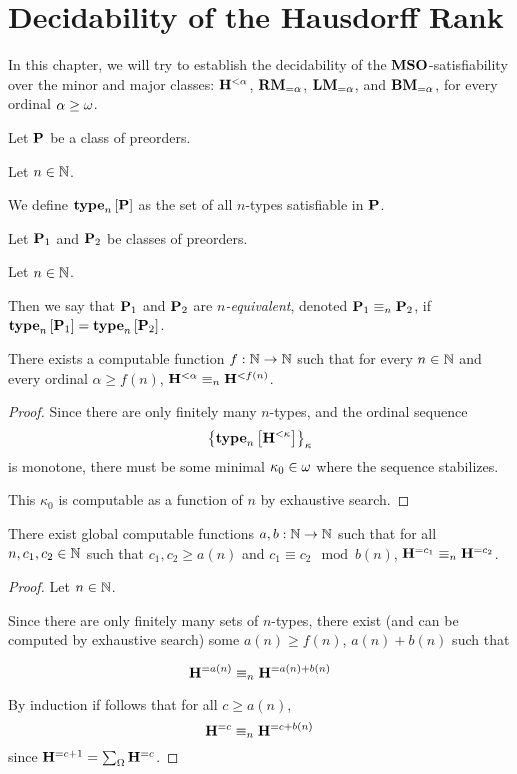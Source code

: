 \section{Decidability of the Hausdorff Rank}

In this chapter, we will try to establish the decidability of the $\mathbf{MSO}$-satisfiability
over the minor and major classes: $\mathbf{H}^{< \alpha}$, $\mathbf{RM}_{= \alpha}$, $\mathbf{LM}_{= \alpha}$, and $\mathbf{BM}_{= \alpha}$,
for every ordinal $\alpha \ge \omega$.

\begin{definition}
    Let $\mathbf{P}$ be a class of preorders.

    Let $n \in \mathbb{N}$.

    We define $\mathbf{type}_{n} \left[ {\mathbf{P}} \right]$ as the set of all
    $n$-types satisfiable in $\mathbf{P}$.
\end{definition}

\begin{definition}
    Let $\mathbf{P}_1$ and $\mathbf{P}_2$ be classes of preorders.

    Let $n \in \mathbb{N}$.

    Then we say that $\mathbf{P}_1$ and $\mathbf{P}_2$ are \emph{$n$-equivalent},
    denoted $\mathbf{P}_1 \equiv_n \mathbf{P}_2$,
    if $\mathbf{type}_{n} \left[ {\mathbf{P}_1} \right] = \mathbf{type}_{n} \left[ {\mathbf{P}_2} \right]$.
\end{definition}

\begin{lemma}\label{minor-computable}
    There exists a computable function $f: \mathbb{N} \to \mathbb{N}$ such that
    for every $n \in \mathbb{N}$ and every ordinal $\alpha \ge f(n)$,
    $\mathbf{H}^{< \alpha} \equiv_n \mathbf{H}^{< f(n)}$.
\end{lemma}

\begin{proof}
    Since there are only finitely many $n$-types,
    and the ordinal sequence \[\left\{ {\mathbf{type}_{n} \left[ {\mathbf{H}^{< \kappa}} \right]} \right\}_{\kappa}\]
    is monotone,
    there must be some minimal $\kappa_0 \in \omega$ where the sequence stabilizes.

    This $\kappa_0$ is computable as a function of $n$ by
    exhaustive search.
\end{proof}

\begin{lemma}\label{ab-lemma}
    There exist global computable functions $a, b : \mathbb{N} \to \mathbb{N}$ such that
    for all $n, c_1, c_2 \in \mathbb{N}$ such that $c_1, c_2 \ge a(n)$ and $c_1 \equiv c_2 \mod b(n)$,
    $\mathbf{H}^{= c_1} \equiv_n \mathbf{H}^{= c_2}$.
\end{lemma}

\begin{proof}
    Let $n \in \mathbb{N}$.

    Since there are only finitely many sets of $n$-types,
    there exist (and can be computed by exhaustive search)
    some $a(n) \ge f(n)$, $a(n) + b(n)$ such that

    \[
        \mathbf{H}^{= a(n)} \equiv_n \mathbf{H}^{= a(n) + b(n)}
    \]

    By induction if follows that for all $c \ge a(n)$,
    \[
        \mathbf{H}^{= c} \equiv_n \mathbf{H}^{= c + b(n)}
    \]
    since $\mathbf{H}^{= c + 1} = \sum_{\Omega} \mathbf{H}^{= c}$.
\end{proof}

